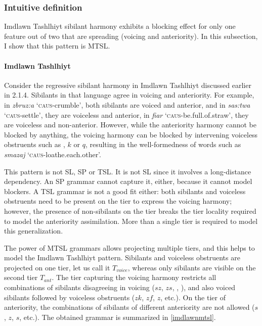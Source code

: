 \subsubsection{Intuitive definition}

Imdlawn Tashlhiyt sibilant harmony exhibits a blocking effect for only one feature out of two that are spreading (voicing and anteriority).
In this subsection, I show that this pattern is MTSL.

\paragraph{Imdlawn Tashlhiyt}
Consider the regressive sibilant harmony in Imdlawn Tashlhiyt discussed earlier in 2.1.4.
Sibilants in that language agree in voicing and anteriority.
For example, in \emph{zbruz:a} `\textsc{caus}-crumble', both sibilants are voiced and anterior, and in \emph{sas:twa} `\textsc{caus}-settle', they are voiceless and anterior, in \emph{\textesh fia\textesh r} `\textsc{caus}-be.full.of.straw', they are voiceless and non-anterior.
However, while the anteriority harmony cannot be blocked by anything, the voicing harmony can be blocked by intervening voiceless obstruents such as \textchi, $k$ or $q$, resulting in the well-formedness of words such as \emph{sm\textesh azaj} `\textsc{caus}-loathe.each.other'.

This pattern is not SL, SP or TSL.
It is not SL since it involves a long-distance dependency.
An SP grammar cannot capture it, either, because it cannot model blockers.
A TSL grammar is not a good fit either: both sibilants and voiceless obstruents need to be present on the tier to express the voicing harmony; however, the presence of non-sibilants on the tier breaks the tier locality required to model the anteriority assimilation.
More than a single tier is required to model this generalization.

The power of MTSL grammars allows projecting multiple tiers, and this helps to model the Imdlawn Tashlhiyt pattern.
Sibilants and voiceless obstruents are projected on one tier, let us call it $T_{voice}$, whereas only sibilants are visible on the second tier $T_{ant}$.
The tier capturing the voicing harmony restricts all combinations of sibilants disagreeing in voicing ($sz$, $zs$, \textesh\textyogh, \textyogh\textesh), and also voiced sibilants followed by voiceless obstruents ($zk$, $zf$, $z$\textchi, etc.).
On the tier of anteriority, the combinations of sibilants of different anteriority are not allowed ($s$\textesh, $z$\textesh, \textesh$s$, etc.).
The obtained grammar is summarized in \ref{imdlawnmtsl}.

